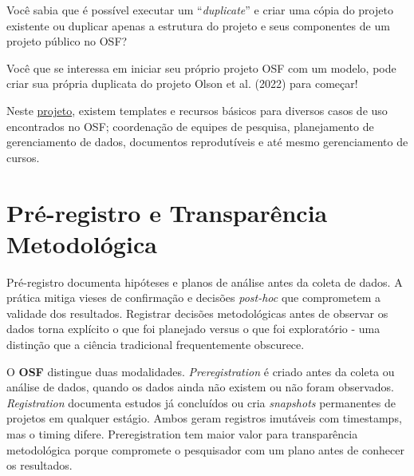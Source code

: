 \documentclass[
  a4paper,
]{book}
\begin{document}
\begin{tcolorbox}[enhanced jigsaw, colback=white, toptitle=1mm, opacityback=0, left=2mm, rightrule=.15mm, title=\textcolor{quarto-callout-tip-color}{\faLightbulb}\hspace{0.5em}{\emph{Duplicando um projeto}}, coltitle=black, opacitybacktitle=0.6, breakable, toprule=.15mm, bottomtitle=1mm, titlerule=0mm, bottomrule=.15mm, arc=.35mm, leftrule=.75mm, colframe=quarto-callout-tip-color-frame, colbacktitle=quarto-callout-tip-color!10!white]

Você sabia que é possível executar um ``\emph{duplicate}'' e criar uma
cópia do projeto existente ou duplicar apenas a estrutura do projeto e
seus componentes de um projeto público no OSF?\vspace{0.5em}

Você que se interessa em iniciar seu próprio projeto OSF com um modelo,
pode criar sua própria duplicata do projeto Olson et al. (2022) para
começar!\vspace{0.5em}

Neste \href{https://osf.io/yaqe8/}{projeto}, existem templates e
recursos básicos para diversos casos de uso encontrados no OSF;
coordenação de equipes de pesquisa, planejamento de gerenciamento de
dados, documentos reprodutíveis e até mesmo gerenciamento de cursos.

\end{tcolorbox}

\section{Pré-registro e Transparência
Metodológica}\label{pruxe9-registro-e-transparuxeancia-metodoluxf3gica}

Pré-registro documenta hipóteses e planos de análise antes da coleta de
dados. A prática mitiga vieses de confirmação e decisões \emph{post-hoc}
que comprometem a validade dos resultados. Registrar decisões
metodológicas antes de observar os dados torna explícito o que foi
planejado versus o que foi exploratório - uma distinção que a ciência
tradicional frequentemente obscurece.

O \textbf{OSF} distingue duas modalidades. \emph{Preregistration} é
criado antes da coleta ou análise de dados, quando os dados ainda não
existem ou não foram observados. \emph{Registration} documenta estudos
já concluídos ou cria \emph{snapshots} permanentes de projetos em
qualquer estágio. Ambos geram registros imutáveis com timestamps, mas o
timing difere. Preregistration tem maior valor para transparência
metodológica porque compromete o pesquisador com um plano antes de
conhecer os resultados.
\end{document}
